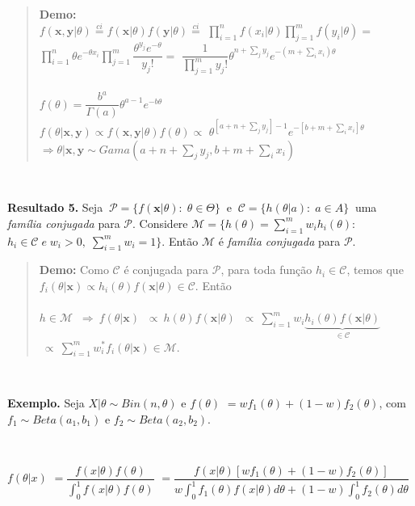 \documentclass[
]{book}
\begin{document}
\begin{quote}
\textbf{Demo:}\\
\(f(\boldsymbol x, \boldsymbol y|\theta)\overset{ci}{=}f(\boldsymbol x|\theta)f(\boldsymbol y|\theta)\overset{ci}{=}\) \(\prod_{i=1}^nf(x_i|\theta)\prod_{j=1}^mf(y_i|\theta)=\) \(\prod_{i=1}^n\theta e^{-\theta x_i}\prod_{j=1}^m\dfrac{\theta^{y_j}e^{-\theta}}{y_j!}=\) \(\dfrac{1}{\prod_{j=1}^my_j!}\theta^{n+\sum_j y_j}e^{-(m+\sum_ix_i)\theta}\)\\
\(~\)\\
\(f(\theta)=\dfrac{b^a}{\Gamma(a)}\theta^{a-1}e^{-b\theta}\)
\(~\)\\
\(f(\theta| \boldsymbol{x,y})\propto f(\boldsymbol x, \boldsymbol y|\theta)f(\theta)\propto\) \(\theta^{[a+n+\sum_jy_j]-1}e^{-[b+m+\sum_ix_i]\theta}\)
\(~\)\\
\(\Rightarrow \theta| \boldsymbol x,\boldsymbol y \sim Gama(a+n+\sum_jy_j,b+m+\sum_ix_i)\)
\end{quote}

\(~\)

\textbf{Resultado 5.} Seja \(~\mathcal{P}=\{f(\boldsymbol x|\theta):\; \theta \in \Theta\}~\) e \(~\mathcal{C}=\{h(\theta|a):\;a\in A\}~\) uma \emph{família conjugada} para \(\mathcal{P}\). Considere \(\mathcal{M}=\{h(\theta)=\sum_{i=1}^mw_ih_i(\theta):\) \(h_i \in \mathcal{C} \; e \; w_i>0,\; \sum_{i=1}^m w_i=1\}\). Então \(\mathcal{M}\) é \emph{família conjugada} para \(\mathcal{P}\).

\begin{quote}
\textbf{Demo:} Como \(\mathcal{C}\) é conjugada para \(\mathcal{P}\), para toda função \(h_i \in \mathcal{C}\), temos que \(f_i(\theta|\boldsymbol x)\propto h_i(\theta)f(\boldsymbol x|\theta)\in \mathcal{C}\). Então\\
\(~\)\\
\(h\in \mathcal{M}\) \(~\Rightarrow~ f(\theta|\boldsymbol x)\) \(~\propto~ h(\theta)f(\boldsymbol x|\theta)\) \(~\propto~\sum_{i=1}^m w_i\underbrace{h_i(\theta)f(\boldsymbol x|\theta)}_{\in \mathcal{C}}\) \(~\propto~\sum_{i=1}^m w_i^*f_i(\theta|\boldsymbol x)\in \mathcal{M}\).
\end{quote}

\(~\)

\textbf{Exemplo.} Seja \(X|\theta \sim Bin(n,\theta)\) e \(f(\theta)\) \(=wf_1(\theta)+(1-w)f_2(\theta)\), com \(f_1\sim Beta(a_1,b_1)\) e \(f_2\sim Beta(a_2,b_2)\).

\(~\)

\(f(\theta|x)\) \(=\dfrac{f(x|\theta)f(\theta)}{\int_0^1f(x|\theta)f(\theta)}\) \(=\dfrac{f(x|\theta)[wf_1(\theta)+(1-w)f_2(\theta)]}{w\int_0^1f_1(\theta)f(x|\theta)d\theta+(1-w)\int_0^1f_2(\theta)d\theta}\)
\end{document}
